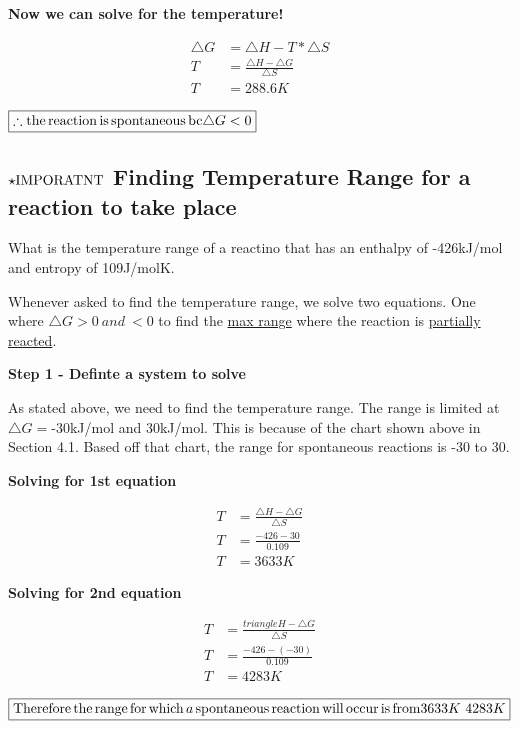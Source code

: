 \documentclass[12pt]{article}
\begin{document}
\textbf{Now we can solve for the temperature!}

\begin{align*}
\triangle{G} 		&= \triangle{H} - T*\triangle{S}\\
T 				&= \frac{\triangle{H} - \triangle{G}}{\triangle{S}}\\
T 				&= 288.6K
\end{align*}

$\boxed{\therefore \ce{the reaction is spontaneous bc} \triangle{G} < 0}$

\subsection{$\star\ce{IMPORATNT}$ Finding Temperature Range for a reaction to take place}

What is the temperature range of a reactino that has an enthalpy of -426kJ/mol and entropy of 109J/molK.

Whenever asked to find the temperature range, we solve two equations. One where $\triangle{G} > 0\ and\ < 0$ to find the \underline{max range} where the reaction is \underline{partially reacted}.


\textbf{Step 1 - Definte a system to solve}

As stated above, we need to find the temperature range. The range is limited at $\triangle{G} =$-30kJ/mol and 30kJ/mol. This is because of the chart shown above in Section 4.1. Based off that chart, the range for spontaneous reactions is -30 to 30.

\textbf{Solving for 1st equation}

\begin{align*}
T &= \frac{\triangle{H} - \triangle{G}}{\triangle{S}}\\
T &= \frac{-426 - 30}{0.109}\\
T &= 3633K
\end{align*}

\textbf{Solving for 2nd equation}

\begin{align*}
T &= \frac{triangle{H} - \triangle{G}}{\triangle{S}}\\
T &= \frac{-426 - (-30)}{0.109}\\
T &= 4283K
\end{align*}

$\boxed{\ce{Therefore the range for which a spontaneous reaction will occur is from} 3633K ~ 4283K}$
\end{document}
